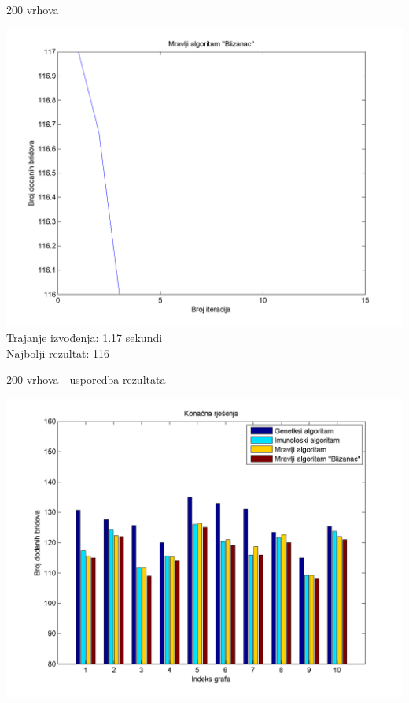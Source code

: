 \documentclass{beamer}
\begin{document}
\begin{frame}{200 vrhova}
\begin{center}
\includegraphics[scale = 0.4]{MrBl200.png}\\
Trajanje izvođenja: 1.17 sekundi\\
Najbolji rezultat: 116\\
\end{center}
\end{frame}

\begin{frame}{200 vrhova - usporedba rezultata}
\begin{center}
\includegraphics[scale = 0.45]{prvih10.png}\\
\end{center}
\end{frame}
\end{document}
